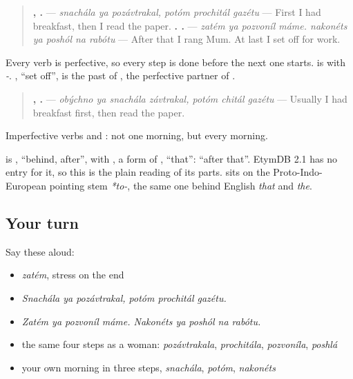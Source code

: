 \begin{grammarlens}[title={Grammar Lens: one finished step, then the next}]
\begin{quote}
\textbf{  ,   .} — \emph{snachála ya pozávtrakal, potóm prochitál gazétu} — First I had breakfast, then I read the paper. \textbf{   .     .} — \emph{zatém ya pozvoníl máme. nakonéts ya poshól na rabótu} — After that I rang Mum. At last I set off for work.
\end{quote}

Every verb is perfective, so every step is done before the next one starts. \emph{} is \emph{} with \emph{-}. \textbf{}, \textquotedblleft{}set off\textquotedblright{}, is the past of \emph{}, the perfective partner of \emph{}.
\end{grammarlens}

\begin{culture}
\begin{quote}
\textbf{   ,   .} — \emph{obýchno ya snachála závtrakal, potóm chitál gazétu} — Usually I had breakfast first, then read the paper.
\end{quote}

Imperfective verbs and \textbf{}: not one morning, but every morning.
\end{culture}

\begin{cousinweb}
\textbf{} is \emph{}, \textquotedblleft{}behind, after\textquotedblright{}, with \emph{}, a form of \textbf{}, \textquotedblleft{}that\textquotedblright{}: \textquotedblleft{}after that\textquotedblright{}. EtymDB 2.1 has no entry for it, so this is the plain reading of its parts. \textbf{} sits on the Proto-Indo-European pointing stem \emph{*to-}, the same one behind English \emph{that} and \emph{the}.
\end{cousinweb}

\subsection*{Your turn}
Say these aloud:

\begin{itemize}
\raggedright
  \item \emph{zatém}, stress on the end
  \item \emph{Snachála ya pozávtrakal, potóm prochitál gazétu.}
  \item \emph{Zatém ya pozvoníl máme. Nakonéts ya poshól na rabótu.}
  \item the same four steps as a woman: \emph{pozávtrakala}, \emph{prochitála}, \emph{pozvoníla}, \emph{poshlá}
  \item your own morning in three steps, \emph{snachála}, \emph{potóm}, \emph{nakonéts}
\end{itemize}

